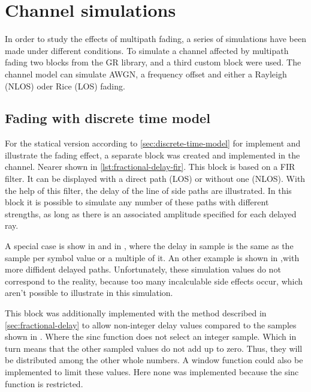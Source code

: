 \section{Channel simulations}

In order to study the effects of multipath fading, a series of simulations have been made under different conditions. To simulate a channel affected by multipath fading two blocks from the GR library, and a third custom block were used. The channel model can simulate AWGN, a frequency offset and either a Rayleigh (NLOS) oder Rice (LOS) fading.

\subsection{Fading with discrete time model} \label{sec:discrete-time-model-fir}

For the statical version according to \ref{sec:discrete-time-model} for implement and illustrate the fading effect, a separate block was created and implemented in the channel. Nearer shown in \ref{lst:fractional-delay-fir}. This block is based on a FIR filter. It can be displayed with a direct path (LOS) or without one (NLOS).
With the help of this filter, the delay of the line of side paths are illustrated. In this block it is possible to simulate any number of these paths with different strengths, as long as there is an associated amplitude specified for each delayed ray. 

A special case is show in  and in , where the delay in sample is the same as the sample per symbol value or a multiple of it. An other example is shown in ,with more diffident delayed paths.
Unfortunately, these simulation values do not correspond to the reality, because too many incalculable side effects occur, which aren't possible to illustrate in this simulation.

This block was additionally implemented with the method described in \ref{sec:fractional-delay} to allow non-integer delay values compared to the samples shown in . Where the sinc function does not select an integer sample. Which in turn means that the other sampled values do not add up to zero.
Thus, they will be distributed among the other whole numbers. A window function could also be implemented to limit these values. Here none was implemented because the sinc function is restricted.

